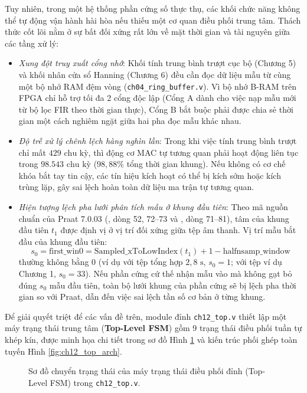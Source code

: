 Tuy nhiên, trong một hệ thống phần cứng số thực thụ, các khối chức năng không thể tự động vận hành hài hòa nếu thiếu một cơ quan điều phối trung tâm. Thách thức cốt lõi nằm ở sự bất đối xứng rất lớn về mặt thời gian và tài nguyên giữa các tầng xử lý:
\begin{itemize}
    \item \emph{Xung đột truy xuất cổng nhớ}: Khối tính trung bình trượt cục bộ (Chương 5) và khối nhân cửa sổ Hanning (Chương 6) đều cần đọc dữ liệu mẫu từ cùng một bộ nhớ RAM đệm vòng (\texttt{ch04\_ring\_buffer.v}). Vì bộ nhớ B-RAM trên FPGA chỉ hỗ trợ tối đa 2 cổng độc lập (Cổng A dành cho việc nạp mẫu mới từ bộ lọc FIR theo thời gian thực), Cổng B bắt buộc phải được chia sẻ thời gian một cách nghiêm ngặt giữa hai pha đọc mẫu khác nhau.
    \item \emph{Độ trễ xử lý chênh lệch hàng nghìn lần}: Trong khi việc tính trung bình trượt chỉ mất $429\text{ chu kỳ}$, thì động cơ MAC tự tương quan phải hoạt động liên tục trong $98.543\text{ chu kỳ}$ ($98{,}88\%$ tổng thời gian khung). Nếu không có cơ chế khóa bắt tay tin cậy, các tín hiệu kích hoạt có thể bị kích sớm hoặc kích trùng lặp, gây sai lệch hoàn toàn dữ liệu ma trận tự tương quan.
    \item \emph{Hiện tượng lệch pha lưới phân tích mẫu ở khung đầu tiên}: Theo mã nguồn chuẩn của Praat 7.0.03 (, dòng 52, 72--73 và , dòng 71--81), tâm của khung đầu tiên $t_1$ được định vị ở vị trí đối xứng giữa tệp âm thanh. Vị trí mẫu bắt đầu của khung đầu tiên:
    \begin{equation}
        s_0 = \text{first\_win0} = \text{Sampled\_xToLowIndex}(t_1) + 1 - \text{halfnsamp\_window}
    \end{equation}
    thường không bằng 0 (ví dụ với tệp tổng hợp $2{,}8\text{ s}$, $s_0 = 1$; với tệp ví dụ Chương 1, $s_0 = 33$). Nếu phần cứng cứ thế nhận mẫu vào mà không gạt bỏ đúng $s_0$ mẫu đầu tiên, toàn bộ lưới khung của phần cứng sẽ bị lệch pha thời gian so với Praat, dẫn đến việc sai lệch tần số cơ bản ở từng khung.
\end{itemize}

Để giải quyết triệt để các vấn đề trên, module đỉnh \texttt{ch12\_top.v} thiết lập một máy trạng thái trung tâm (\textbf{Top-Level FSM}) gồm 9 trạng thái điều phối tuần tự khép kín, được minh họa chi tiết trong sơ đồ Hình \ref{fig:ch12_top_fsm} và kiến trúc phối ghép toàn tuyến Hình \ref{fig:ch12_top_arch}.

\begin{figure}[htbp]
\centering

\caption{Sơ đồ chuyển trạng thái của máy trạng thái điều phối đỉnh (Top-Level FSM) trong \texttt{ch12\_top.v}.}
\label{fig:ch12_top_fsm}
\end{figure}

